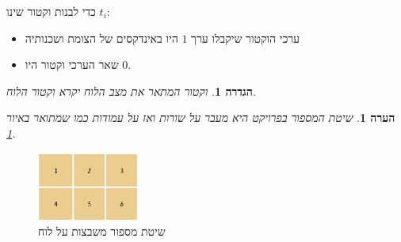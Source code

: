 \documentclass[12pt,leqno]{article}
\theoremstyle{theoremdd}
\newtheorem{definition}{הגדרה}[section]
\newtheorem{comm}{הערה}[section]
\begin{document}
כדי לבנות וקטור שינו 
$t_i$:
\begin{itemize}
    \item 
    ערכי הוקטור שיקבלו ערך
    $1$
    היו באינדקסים 
    של הצומת 
    ושכנותיה
    \item 
    שאר הערכי וקטור 
    היו 
    $0$.
\end{itemize}
\begin{definition}
    \label{def:board-vector}
    וקטור המתאר את מצב הלוח יקרא וקטור הלוח.
\end{definition}
\begin{comm}
    \label{ comm: indexing board game}
    שיטת המספור בפרויקט 
    היא מעבר 
    על שורות ואז על עמודות כמו שמתואר באיור
    \ref{fig:numbering_board_2x2}.
\end{comm}
\begin{figure}[ht]
    \caption{שיטת מספור משבצות על לוח}
    \label{fig:numbering_board_2x2}
    \centering
    \includegraphics[width=0.3\textwidth,keepaspectratio]{images/2x3_board.PNG}
\end{figure}
\end{document}
